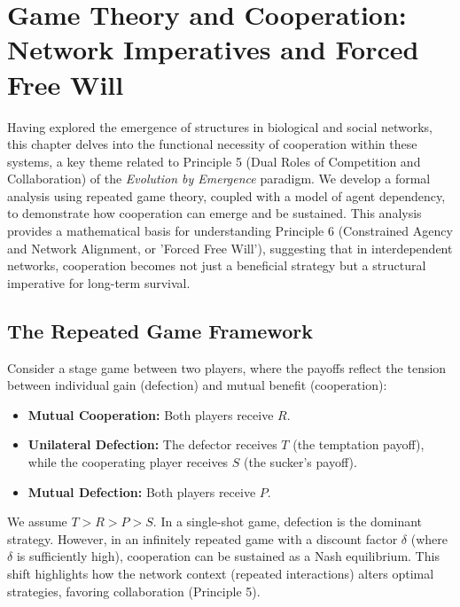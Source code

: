 \chapter{Game Theory and Cooperation: Network Imperatives and Forced Free Will} %
\label{ch:GameTheory}

Having explored the emergence of structures in biological and social networks, this chapter delves into the functional necessity of cooperation within these systems, a key theme related to Principle 5 (Dual Roles of Competition and Collaboration) of the \emph{Evolution by Emergence} paradigm. We develop a formal analysis using repeated game theory, coupled with a model of agent dependency, to demonstrate how cooperation can emerge and be sustained. This analysis provides a mathematical basis for understanding Principle 6 (Constrained Agency and Network Alignment, or 'Forced Free Will'), suggesting that in interdependent networks, cooperation becomes not just a beneficial strategy but a structural imperative for long-term survival. %

\section{The Repeated Game Framework}
Consider a stage game between two players, where the payoffs reflect the tension between individual gain (defection) and mutual benefit (cooperation):
\begin{itemize}
    \item \textbf{Mutual Cooperation:} Both players receive \( R \).
    \item \textbf{Unilateral Defection:} The defector receives \( T \) (the temptation payoff), while the cooperating player receives \( S \) (the sucker's payoff).
    \item \textbf{Mutual Defection:} Both players receive \( P \).
\end{itemize}
We assume \( T > R > P > S \). In a single-shot game, defection is the dominant strategy. However, in an infinitely repeated game with a discount factor \( \delta \) (where \( \delta \) is sufficiently high), cooperation can be sustained as a Nash equilibrium. This shift highlights how the network context (repeated interactions) alters optimal strategies, favoring collaboration (Principle 5). %

